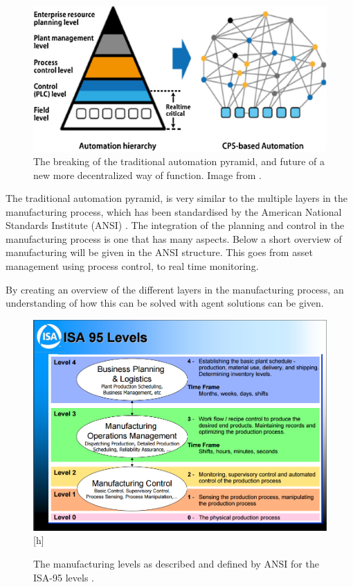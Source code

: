 \begin{figure}
\centering
\includegraphics[width=0.9\linewidth]{"img/traditional automation pyramid1"}
\caption{The breaking of the traditional automation pyramid, and future of a new more decentralized way of function. Image from \citep{monostori2016cyber}.}
\label{fig:traditional-automation-pyramid1}
\end{figure}

The traditional automation pyramid, is very similar to the multiple layers in the manufacturing process, which has been standardised by the American National Standards Institute (ANSI) \citep{harjunkoski2009integration}. The integration of the planning and control in the manufacturing process is one that has many aspects. Below a short overview of manufacturing will be given in the ANSI structure. This goes from asset management using process control, to real time monitoring. 

By creating an overview of the different layers in the manufacturing process, an understanding of how this can be solved with agent solutions can be given. 	
\begin{figure}
\centering
\includegraphics[width=0.9\linewidth]{img/ansi-isa-95}[h]
\caption{The manufacturing levels as described and defined by ANSI for the ISA-95 levels \citep{brandl2008ISA}. }
\label{fig:ansi-isa-95}
\end{figure}

